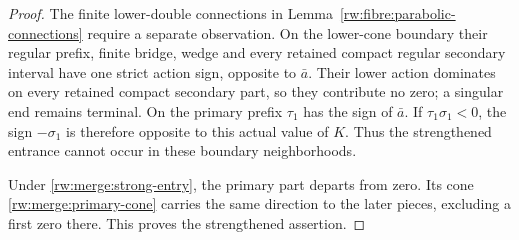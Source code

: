 \begin{proof}
The finite lower-double connections in
Lemma~\ref{rw:fibre:parabolic-connections} require a separate
observation. On the lower-cone boundary their regular prefix,
finite bridge, wedge and every retained compact regular
secondary interval have one strict action sign, opposite to
$\bar a$. Their lower action dominates on every retained compact
secondary part, so they contribute no zero; a singular end remains
terminal. On the primary prefix
$\tau_1$ has the sign of $\bar a$. If
$\tau_1\sigma_1<0$, the sign $-\sigma_1$ is therefore
opposite to this actual value of $K$. Thus the strengthened
entrance cannot occur in these boundary neighborhoods.

Under \eqref{rw:merge:strong-entry}, the primary part departs from
zero. Its cone \eqref{rw:merge:primary-cone} carries the same direction
to the later pieces, excluding a first zero there. This proves the
strengthened assertion.
\end{proof}
